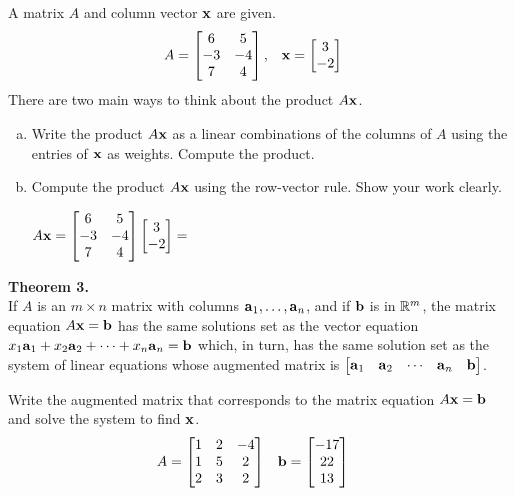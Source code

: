 \begin{exercise} %
	A matrix $A$ and column vector $\boldsymbol{\mathbf{x}}$ are given.
	\begin{align*}
	A &= \begin{bmatrix}6&5\\-3&-4\\7&4\end{bmatrix}, &
	\boldsymbol{\mathbf{x}} &= \begin{bmatrix}3\\-2\end{bmatrix}
	\end{align*}
	There are two main ways to think about the product $A\boldsymbol{\mathbf{x}}$.
	\begin{multicols}{2}
		\begin{enumerate}[(a)]
			\item Write the product $A\boldsymbol{\mathbf{x}}$ as a linear combinations of the columns of $A$ using the entries of $\boldsymbol{\mathbf{x}}$ as weights. Compute the product.
			\columnbreak
			\item Compute the product $A\boldsymbol{\mathbf{x}}$ using the row-vector rule. Show your work clearly. \par
			$ A\boldsymbol{\mathbf{x}} = \begin{bmatrix}6&5\\-3&-4\\7&4\end{bmatrix}\begin{bmatrix}3\\-2\end{bmatrix} = $
		\end{enumerate}
	\end{multicols}
\end{exercise}
\vfill

\begin{boxthm}
	\textbf{Theorem 3.} \\
	If $A$ is an $m\times n$ matrix with columns $\boldsymbol{\mathbf{a}}_1,\ldots,\boldsymbol{\mathbf{a}}_n$, and if $\boldsymbol{\mathbf{b}}$ is in $\mathbb{R}^m$, the matrix equation $A\boldsymbol{\mathbf{x}}=\boldsymbol{\mathbf{b}}$ has the same solutions set as the vector equation $x_1\boldsymbol{\mathbf{a}}_1+x_2\boldsymbol{\mathbf{a}}_2+\cdots+x_n\boldsymbol{\mathbf{a}}_n=\boldsymbol{\mathbf{b}}$ which, in turn, has the same solution set as the system of linear equations whose augmented matrix is $\begin{bmatrix}\boldsymbol{\mathbf{a}}_1&\boldsymbol{\mathbf{a}}_2&\cdots&\boldsymbol{\mathbf{a}}_n&\boldsymbol{\mathbf{b}}\end{bmatrix}$.
\end{boxthm}

\begin{exercise} %
	Write the augmented matrix that corresponds to the matrix equation $A\boldsymbol{\mathbf{x}}=\boldsymbol{\mathbf{b}}$ and solve the system to find $\boldsymbol{\mathbf{x}}$.
	\begin{align*}
	A &= \begin{bmatrix}1&2&-4\\1&5&2\\2&3&2\end{bmatrix} &
	\boldsymbol{\mathbf{b}} &= \begin{bmatrix}-17\\22\\13\end{bmatrix}
	\end{align*}
\end{exercise}
\vfill


